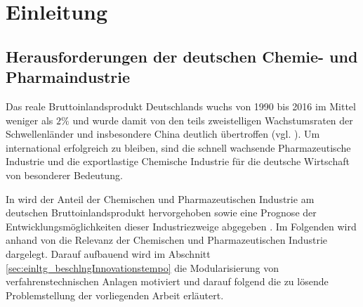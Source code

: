 \chapter{Einleitung}\label{ch:einleitung}
\section{Herausforderungen der deutschen Chemie- und Pharmaindustrie}\label{sec:einltg_chemPharmaIndustrie}
Das reale Bruttoinlandsprodukt Deutschlands wuchs von 1990 bis 2016 im Mittel weniger als $2\%$ und wurde damit von den teils zweistelligen Wachstumsraten der Schwellenl\"ander und insbesondere China deutlich \"ubertroffen {(vgl. \cite[S. 6]{BIP_2016})}. Um international erfolgreich zu bleiben, sind die schnell wachsende Pharmazeutische Industrie und die exportlastige Chemische Industrie f\"ur die deutsche Wirtschaft von besonderer Bedeutung. 

In  wird der Anteil der Chemischen und Pharmazeutischen Industrie am deutschen Bruttoinlandsprodukt hervorgehoben sowie eine Prognose der Entwicklungsm\"oglichkeiten dieser Industriezweige abgegeben \cite{PerspektiveD_2016}. Im Folgenden wird anhand von \cite{PerspektiveD_2016} die Relevanz der Chemischen und Pharmazeutischen Industrie dargelegt. Darauf aufbauend wird im Abschnitt \ref{sec:einltg_beschlngInnovationstempo} die Modularisierung von verfahrenstechnischen Anlagen motiviert und darauf folgend die zu l\"osende Problemstellung der vorliegenden Arbeit erl\"autert.

